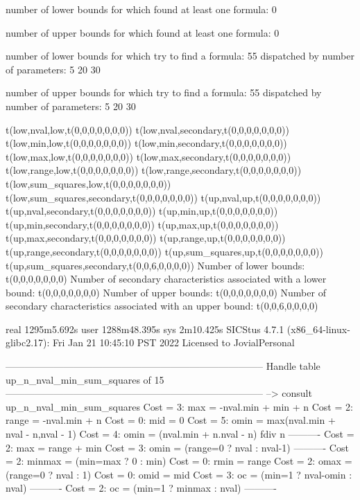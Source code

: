 number of lower bounds for which found at least one formula: 0

number of upper bounds for which found at least one formula: 0

number of lower bounds for which try to find a formula: 55
dispatched by number of parameters: 5  20  30

number of upper bounds for which try to find a formula: 55
dispatched by number of parameters: 5  20  30

t(low,nval,low,t(0,0,0,0,0,0,0))
t(low,nval,secondary,t(0,0,0,0,0,0,0))
t(low,min,low,t(0,0,0,0,0,0,0))
t(low,min,secondary,t(0,0,0,0,0,0,0))
t(low,max,low,t(0,0,0,0,0,0,0))
t(low,max,secondary,t(0,0,0,0,0,0,0))
t(low,range,low,t(0,0,0,0,0,0,0))
t(low,range,secondary,t(0,0,0,0,0,0,0))
t(low,sum_squares,low,t(0,0,0,0,0,0,0))
t(low,sum_squares,secondary,t(0,0,0,0,0,0,0))
t(up,nval,up,t(0,0,0,0,0,0,0))
t(up,nval,secondary,t(0,0,0,0,0,0,0))
t(up,min,up,t(0,0,0,0,0,0,0))
t(up,min,secondary,t(0,0,0,0,0,0,0))
t(up,max,up,t(0,0,0,0,0,0,0))
t(up,max,secondary,t(0,0,0,0,0,0,0))
t(up,range,up,t(0,0,0,0,0,0,0))
t(up,range,secondary,t(0,0,0,0,0,0,0))
t(up,sum_squares,up,t(0,0,0,0,0,0,0))
t(up,sum_squares,secondary,t(0,0,6,0,0,0,0))
Number of lower bounds:                                             t(0,0,0,0,0,0,0)
Number of secondary characteristics associated with a lower bound:  t(0,0,0,0,0,0,0)
Number of upper bounds:                                             t(0,0,0,0,0,0,0)
Number of secondary characteristics associated with an upper bound: t(0,0,6,0,0,0,0)

real	1295m5.692s
user	1288m48.395s
sys	2m10.425s
SICStus 4.7.1 (x86_64-linux-glibc2.17): Fri Jan 21 10:45:10 PST 2022
Licensed to JovialPersonal


--------------------------------------------------------------------------------
Handle table up_n_nval_min_sum_squares of 15
--------------------------------------------------------------------------------
--> consult up_n_nval_min_sum_squares
Cost =  3:  max    = -nval.min + min + n
Cost =  2:  range  = -nval.min + n
Cost =  0:  mid    = 0
Cost =  5:  omin   = max(nval.min + nval - n,nval - 1)
Cost =  4:  omin   = (nval.min + n.nval - n) fdiv n
----------
Cost =  2:  max    = range + min
Cost =  3:  omin   = (range=0 ? nval : nval-1)
----------
Cost =  2:  minmax = (min=max ? 0 : min)
Cost =  0:  rmin   = range
Cost =  2:  omax   = (range=0 ? nval : 1)
Cost =  0:  omid   = mid
Cost =  3:  oc     = (min=1 ? nval-omin : nval)
----------
Cost =  2:  oc     = (min=1 ? minmax : nval)
----------

